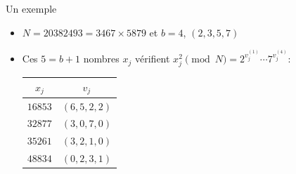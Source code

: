 \documentclass{beamer}
\begin{document}
\begin{frame}{Un exemple}
    \begin{itemize}
        \item $N = 20382493 = 3467 \times 5879$ et $b = 4$, $(2, 3, 5, 7)$
        \item Ces $5=b+1$ nombres $x_j$ vérifient $ x_j^2 \pmod N = 2^{v_j^{(1)}}\cdots 7^{v_j^{(4)}}$:
            \begin{center}
                \begin{tabular}{|c|c|}
                    \hline
                    $x_j$ & $v_j$ \\
                    \hline \hline
                    $16853$ & $(6,5,2,2)$\\
                    \hline
                    $32877$ & $(3,0,7,0)$\\
                    \hline
                    $35261$ & $(3,2,1,0)$\\
                    \hline
                    $48834$ & $(0,2,3,1)$\\
                    \hline
                \end{tabular}
            \end{center}
    \end{itemize}
\end{frame}
\end{document}
